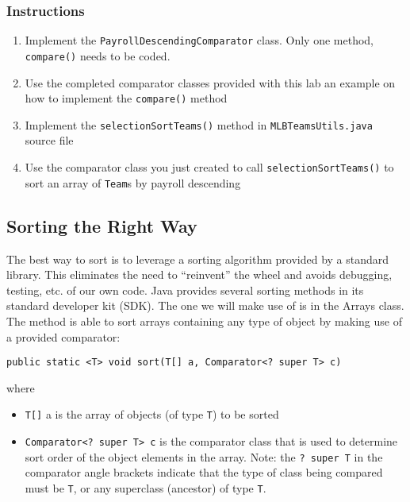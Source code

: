 \documentclass[12pt]{scrartcl}
\begin{document}
\subsubsection*{Instructions}

\begin{enumerate}
  \item Implement the \texttt{PayrollDescendingComparator}
  	class.  Only one method, \texttt{compare()} needs
	to be coded.
  \item Use the completed comparator classes provided with this lab 
  	an example on how to implement the \texttt{compare()} 
	method 
  \item Implement the \texttt{selectionSortTeams()} method in 
	\texttt{MLBTeamsUtils.java} source file
  \item Use the comparator class you just created to call 
	\texttt{selectionSortTeams()} to sort an array of \texttt{Team}s 
	by payroll descending
\end{enumerate}
	
\subsection{Sorting the Right Way}

The best way to sort is to leverage a sorting algorithm provided by 
a standard library.  This eliminates the need to ``reinvent'' the wheel 
and avoids debugging, testing, etc. of our own code.  Java provides 
several sorting methods in its standard developer kit (SDK).  The 
one we will make use of is in the Arrays class.  The method is able 
to sort arrays containing any type of object by making use of a 
provided comparator:

\texttt{public static <T> void sort(T[] a, Comparator<? super T> c)}

where
\begin{itemize}
  \item \texttt{T[]} a is the array of objects (of type 
  	\texttt{T}) to be sorted
  \item \texttt{Comparator<? super T> c} is the comparator 
	class that is used to determine sort order of the object elements 
	in the array.  Note: the \texttt{? super T} in the comparator 
	angle brackets indicate that the type of class being compared must 
	be \texttt{T}, or any superclass (ancestor) of type \texttt{T}.
\end{itemize}
	
\end{document}
